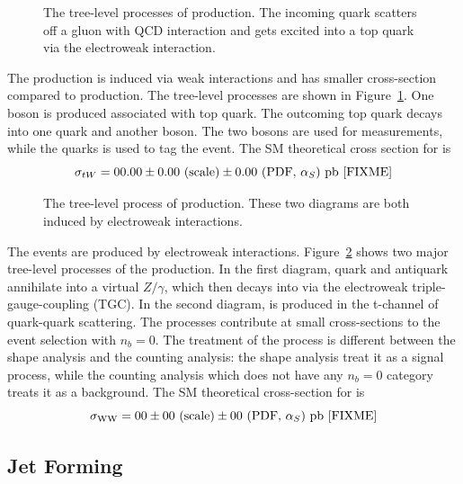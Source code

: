 \begin{figure}[ht]
    \centering
    
    \caption{The tree-level processes of \tW production. The incoming \PQb quark scatters off a gluon with QCD interaction and gets excited into a top quark via the electroweak interaction.}
    \label{fig:physics:ppCollision:tw}
\end{figure}
\noindent The \tW production is induced via weak interactions and has smaller cross-section compared to \ttbar production. The tree-level \tW processes are shown in Figure~\ref{fig:physics:ppCollision:tw}. One \PW boson is produced associated with top quark. The outcoming top quark decays into one \PQb quark and another \PW boson. The two \PW bosons are used for \PW measurements, while the \PQb quarks is used to tag the \tW event. The SM theoretical cross section for \tW is 
\begin{equation}
    \sigma_{tW} = 00.00 \pm 0.00 \text{~(scale)} \pm 0.00 \text{~(PDF, \ensuremath{\alpha_S})~pb [FIXME]}
\end{equation}


\begin{figure}[ht]
    \centering
    
    \caption{The tree-level process of \WW production. These two diagrams are both induced by electroweak interactions. }
    \label{fig:physics:ppCollision:ww}
\end{figure}
\noindent The \WW events are produced by electroweak interactions. Figure~\ref{fig:physics:ppCollision:ww} shows two major tree-level processes of the \WW production. In the first diagram, quark and antiquark annihilate into a virtual $Z/\gamma$, which then decays into \WW via the electroweak triple-gauge-coupling (TGC). In the second diagram, \WW is produced in the t-channel of quark-quark scattering. The \WW processes contribute at small cross-sections to the event selection with $n_b=0$. The treatment of the \WW process is different between the shape analysis and the counting analysis: the shape analysis treat it as a signal process, while the counting analysis which does not have any $n_b=0$ category treats it as a background. The SM theoretical cross-section for \WW is 
\begin{equation}
    \sigma_{\mathrm{WW}} = 00 \pm 00  \text{~(scale)}  \pm 00  \text{~(PDF, \ensuremath{\alpha_S})~pb [FIXME]}
\end{equation}




\subsection{Jet Forming}
\label{sec:physics:ppCollision:jetForming} 

